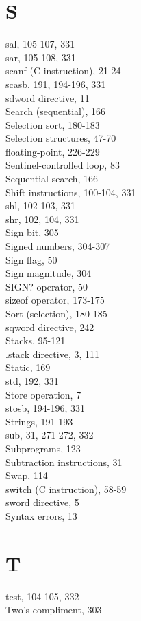 \documentclass[10pt]{article}
\begin{document}
\section*{S}
sal, 105-107, 331\\
sar, 105-108, 331\\
scanf (C instruction), 21-24\\
scasb, 191, 194-196, 331\\
sdword directive, 11\\
Search (sequential), 166\\
Selection sort, 180-183\\
Selection structures, 47-70\\
floating-point, 226-229\\
Sentinel-controlled loop, 83\\
Sequential search, 166\\
Shift instructions, 100-104, 331\\
shl, 102-103, 331\\
shr, 102, 104, 331\\
Sign bit, 305\\
Signed numbers, 304-307\\
Sign flag, 50\\
Sign magnitude, 304\\
SIGN? operator, 50\\
sizeof operator, 173-175\\
Sort (selection), 180-185\\
sqword directive, 242\\
Stacks, 95-121\\
.stack directive, 3, 111\\
Static, 169\\
std, 192, 331\\
Store operation, 7\\
stosb, 194-196, 331\\
Strings, 191-193\\
sub, 31, 271-272, 332\\
Subprograms, 123\\
Subtraction instructions, 31\\
Swap, 114\\
switch (C instruction), 58-59\\
sword directive, 5\\
Syntax errors, 13

\section*{T}
test, 104-105, 332\\
Two's compliment, 303
\end{document}
